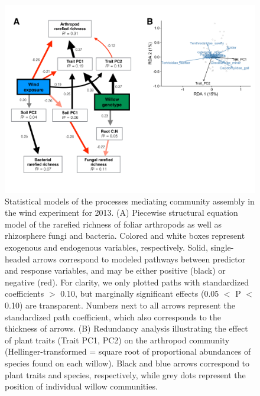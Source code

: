 \documentclass[11pt]{article}
\begin{document}
\begin{figure}[h!]
\centering
\includegraphics[scale = 0.45]{image05.png}
\caption{Statistical models of the processes mediating
community assembly in the wind experiment for 2013. (A) Piecewise
structural equation model of the rarefied richness of foliar arthropods
as well as rhizosphere fungi and bacteria. Colored and white boxes represent
exogenous and endogenous variables, respectively. Solid, single-headed
arrows correspond to modeled pathways between predictor and response
variables, and may be either positive (black) or negative (red). For clarity,
we only plotted paths with standardized coefficients $>$
0.10, but marginally significant effects (0.05 $<$ P $<$ 0.10) are transparent. Numbers next to all arrows represent the standardized path
coefficient, which also corresponds to the thickness of arrows. (B)
Redundancy analysis illustrating the effect of plant traits (Trait PC1, PC2) on the arthropod community (Hellinger-transformed = square root of proportional abundances of species found on each willow).
Black and blue arrows correspond to plant traits and species,
respectively, while grey
dots represent the position of individual willow communities.}
\label{wSEM}
\end{figure}


\end{document}
